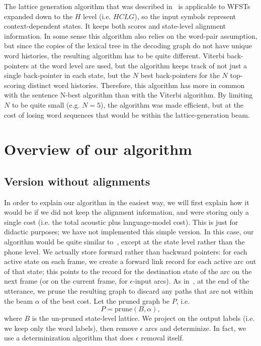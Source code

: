 \documentclass{article}
\def\HCLG{{\mathit{HCLG}}}
\begin{document}
The lattice generation algorithm that was described in~\cite{saon2005anatomy}
is applicable to WFSTs expanded down to the $H$ level (i.e. $\HCLG$),
so the input symbols represent context-dependent states.  It keeps both scores and 
state-level alignment information.  In some sense this algorithm also relies
on the word-pair assumption, but since the copies of the lexical tree in the decoding
graph do not have unique word histories, the resulting algorithm has to be quite
different.  Viterbi back-pointers at the word level are used, but the algorithm keeps track
of not just a single back-pointer in each state, but the $N$ best back-pointers for the $N$ top-scoring distinct
word histories.  Therefore, this algorithm has more in common with the sentence N-best
algorithm than with the Viterbi algorithm.  By limiting $N$ to be quite small (e.g. $N{=}5$),
the algorithm was made efficient, but at the cost of losing word sequences
that would be within the lattice-generation beam.

\section{Overview of our algorithm}
\label{sec:overview}

\subsection{Version without alignments}

In order to explain our algorithm in the easiest way, we will first explain how it would
be if we did not keep the alignment information, and were storing only a single cost
(i.e. the total acoustic plus language-model cost).  This is just for didactic purposes;
we have not implemented this simple version.
In this case, our algorithm would be quite similar
to~\cite{efficient_general}, except at the state level rather than the phone level.
We actually store forward rather than backward pointers: for each active state on each
frame, we create a forward link record for each active arc out of that state; this points
to the record for the destination state of the arc on the next frame (or on 
the current frame, for $\epsilon$-input
arcs).   As in~\cite{efficient_general}, at the end of the utterance,
we prune the resulting graph to discard any paths that are not within the beam $\alpha$ of the best cost. 
Let the pruned graph be $P$, i.e.
\begin{equation}
  P = \mathrm{prune}(B, \alpha),
\end{equation}
where $B$ is the un-pruned state-level lattice.
We project on the output labels (i.e. we keep only the word labels), then remove $\epsilon$
arcs and determinize.  In fact, we use a determinization algorithm that does $\epsilon$
removal itself.
\end{document}
